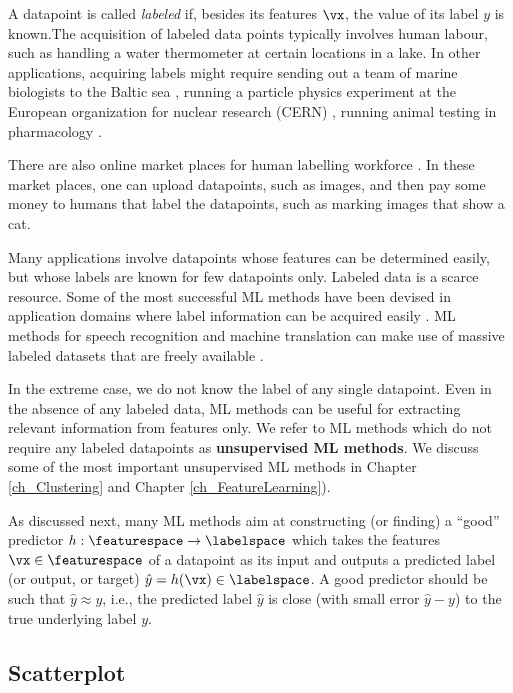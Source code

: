 \documentclass[12pt]{report}
\begin{document}
A datapoint is called \emph{labeled} if, besides its features $\vx$, 
the value of its label $y$ is known.The acquisition of labeled data 
points typically involves human labour, such as handling a water 
thermometer at certain locations in a lake. In other applications, 
acquiring labels might require sending out a team of marine biologists 
to the Baltic sea \cite{MLMarineBiology}, running a particle physics 
experiment at the European organization for nuclear research (CERN) \cite{MLCERN}, 
running animal testing in pharmacology \cite{MLPharma}. 

There are also online market places for human labelling 
workforce \cite{Mort2018}. In these market places, one 
can upload datapoints, such as images, and then pay 
some money to humans that label the datapoints, such 
as marking images that show a cat. 

Many applications involve datapoints whose features can be 
determined easily, but whose labels are known for few datapoints 
only. Labeled data is a scarce resource. Some of the most successful 
ML methods have been devised in application domains where 
label information can be acquired easily \cite{UnreasonableData}. 
ML methods for  speech recognition and machine translation can 
make use of massive labeled datasets that are freely available \cite{Koehn2005}. 

In the extreme case, we do not know the label of any single 
datapoint. Even in the absence of any labeled data, ML methods 
can be useful for extracting relevant information from 
features only. We refer to ML methods which do not require 
any labeled datapoints as {\bf unsupervised ML methods}. 
We discuss some of the most important unsupervised ML 
methods in Chapter \ref{ch_Clustering} and Chapter \ref{ch_FeatureLearning}).  

As discussed next, many ML methods aim at constructing 
(or finding) a ``good'' predictor $h: \featurespace \rightarrow \labelspace$ 
which takes the features $\vx \in \featurespace$ of a datapoint 
as its input and outputs a predicted label (or output, or target) 
$\hat{y} = h(\vx) \in \labelspace$. A good predictor should be 
such that $\hat{y} \approx y$, i.e., the predicted label $\hat{y}$ 
is close (with small error $\hat{y} - y$) to the true underlying label $y$. 

\subsection{Scatterplot} 
\label{equ_subsection_scatterplot}
\end{document}

